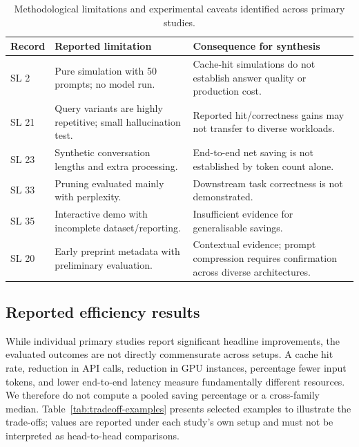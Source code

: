 \IfFileExists{jair.cls}{\documentclass{jair}}{\documentclass[manuscript,nonacm,screen]{acmart}}
\begin{document}
\begin{table}[t]
\caption{Methodological limitations and experimental caveats identified across primary studies.}
\label{tab:quality-caveats}
\centering
\footnotesize
\begin{tabularx}{\textwidth}{@{}>{\RaggedRight\arraybackslash}p{} >{\RaggedRight\arraybackslash}p{} >{\RaggedRight\arraybackslash}X@{}}
\toprule Record & Reported limitation & Consequence for synthesis \\
\midrule
SL 2 \cite{S02} & Pure simulation with 50 prompts; no model run. & Cache-hit simulations do not establish answer quality or production cost. \\
SL 21 \cite{S21} & Query variants are highly repetitive; small hallucination test. & Reported hit/correctness gains may not transfer to diverse workloads. \\
SL 23 \cite{S23} & Synthetic conversation lengths and extra processing. & End-to-end net saving is not established by token count alone. \\
SL 33 \cite{S33} & Pruning evaluated mainly with perplexity. & Downstream task correctness is not demonstrated. \\
SL 35 \cite{S35} & Interactive demo with incomplete dataset/reporting. & Insufficient evidence for generalisable savings. \\
SL 20 \cite{S20} & Early preprint metadata with preliminary evaluation. & Contextual evidence; prompt compression requires confirmation across diverse architectures. \\
\bottomrule
\end{tabularx}
\end{table}

\subsection{Reported efficiency results}

While individual primary studies report significant headline improvements, the evaluated outcomes are not directly commensurate across setups. A cache hit rate, reduction in API calls, reduction in GPU instances, percentage fewer input tokens, and lower end-to-end latency measure fundamentally different resources. We therefore do not compute a pooled saving percentage or a cross-family median. Table~\ref{tab:tradeoff-examples} presents selected examples to illustrate the trade-offs; values are reported under each study's own setup and must not be interpreted as head-to-head comparisons.
\end{document}
